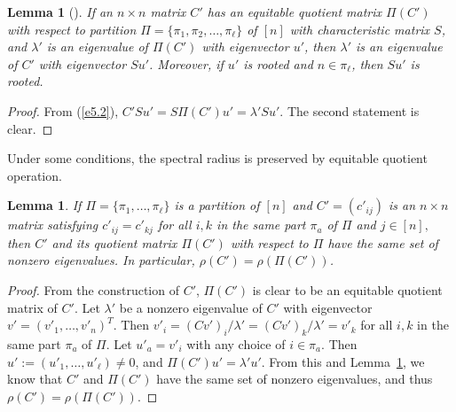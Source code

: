 \documentclass[final,3p, times, 12pt]{elsarticle}
\theoremstyle{plain}
\newtheorem{lem}[thm]{Lemma}
\theoremstyle{definition}
\theoremstyle{remark}
\numberwithin{equation}{section}
\begin{document}
\begin{lem}[{\cite[Lemma 2.3.1]{Brou}}]\label{q1}
If an $n\times n$ matrix $C'$ has an equitable quotient matrix $\Pi(C')$ with respect to partition $\Pi=\{\pi_1, \pi_2, \ldots, \pi_\ell\}$ of $[n]$ with characteristic matrix $S$,  and $\lambda'$ is an eigenvalue of  $\Pi(C')$ with eigenvector $u'$,   then   $\lambda'$ is an  eigenvalue of $C'$ with eigenvector  $Su'$. Moreover, if $u'$ is rooted and $n\in \pi_\ell$, then $Su'$ is rooted.
\end{lem}
\begin{proof} From (\ref{e5.2}),
$C'Su'=S\Pi(C')u'=\lambda' Su'.$ The second statement is clear.
\end{proof}


Under some conditions, the spectral radius is preserved by equitable quotient operation.

\begin{lem}\label{lem2.2'} If $\Pi=\{\pi_1,\ldots, \pi_\ell\}$ is a partition of $[n]$ and
  $C'=(c'_{ij})$ is an $n\times n$ matrix satisfying
 $c'_{ij}=c'_{kj}$ for all $i, k$ in the same part $\pi_a$ of $\Pi$ and $j\in [n],$
 then $C'$ and its quotient matrix $\Pi(C')$ with respect to $\Pi$ have the same set of nonzero eigenvalues.
 In particular, $\rho(C')=\rho(\Pi(C'))$.
\end{lem}
\begin{proof} From the construction of $C'$, $\Pi(C')$ is clear to be an equitable quotient matrix of $C'$.
Let $\lambda'$ be a nonzero eigenvalue of $C'$ with eigenvector $v'=(v'_1,\ldots,v'_n)^T$.
Then $v'_i=(Cv')_i/\lambda'=(Cv')_{k}/\lambda'=v'_{k}$ for all $i, k$  in the same part $\pi_a$ of $\Pi.$
Let $u'_a=v'_i$ with any choice of  $i\in \pi_a.$
Then $u':=(u'_1,\ldots,u'_\ell)\ne 0$, and  $\Pi(C')u'=\lambda' u'$.
 From this and Lemma~\ref{q1}, we know that $C'$ and $\Pi(C')$ have the same set of nonzero eigenvalues, and thus $\rho(C')=\rho(\Pi(C')).$
\end{proof}
\end{document}
